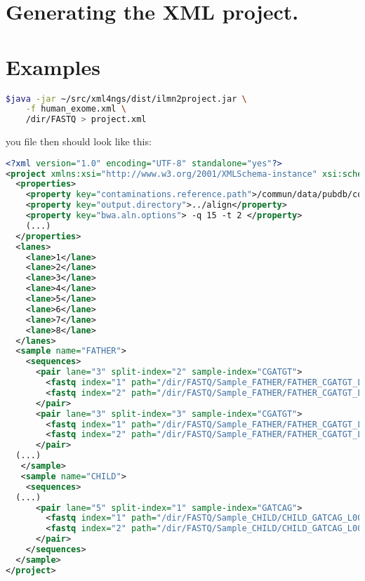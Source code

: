 \documentclass{article}
\begin{document}


\section{Generating the XML project.}


\section{Examples}



\begin{lstlisting}[language=bash]
$java -jar ~/src/xml4ngs/dist/ilmn2project.jar \
	-f human_exome.xml \
	/dir/FASTQ > project.xml
\end{lstlisting}

you file then should look like this:
\begin{lstlisting}[language=XML,breaklines=true]
<?xml version="1.0" encoding="UTF-8" standalone="yes"?>
<project xmlns:xsi="http://www.w3.org/2001/XMLSchema-instance" xsi:schemaLocation="https://raw.github.com/lindenb/xml4ngs/master/src/main/resources/xsd/project.xsd">
  <properties>
    <property key="contaminations.reference.path">/commun/data/pubdb/contaminants/contaminants.fa</property>
    <property key="output.directory">../align</property>
    <property key="bwa.aln.options"> -q 15 -t 2 </property>
    (...)
  </properties>
  <lanes>
    <lane>1</lane>
    <lane>2</lane>
    <lane>3</lane>
    <lane>4</lane>
    <lane>5</lane>
    <lane>6</lane>
    <lane>7</lane>
    <lane>8</lane>
  </lanes>
  <sample name="FATHER">
    <sequences>
      <pair lane="3" split-index="2" sample-index="CGATGT">
        <fastq index="1" path="/dir/FASTQ/Sample_FATHER/FATHER_CGATGT_L003_R1_002.fastq.gz"/>
        <fastq index="2" path="/dir/FASTQ/Sample_FATHER/FATHER_CGATGT_L003_R2_002.fastq.gz"/>
      </pair>
      <pair lane="3" split-index="3" sample-index="CGATGT">
        <fastq index="1" path="/dir/FASTQ/Sample_FATHER/FATHER_CGATGT_L003_R1_003.fastq.gz"/>
        <fastq index="2" path="/dir/FASTQ/Sample_FATHER/FATHER_CGATGT_L003_R2_003.fastq.gz"/>
      </pair>
  (...)
   </sample>
   <sample name="CHILD">
    <sequences>
  (...)
      <pair lane="5" split-index="1" sample-index="GATCAG">
        <fastq index="1" path="/dir/FASTQ/Sample_CHILD/CHILD_GATCAG_L005_R1_001.fastq.gz"/>
        <fastq index="2" path="/dir/FASTQ/Sample_CHILD/CHILD_GATCAG_L005_R2_001.fastq.gz"/>
      </pair>
    </sequences>
  </sample>
</project>
\end{lstlisting}
\end{document}
